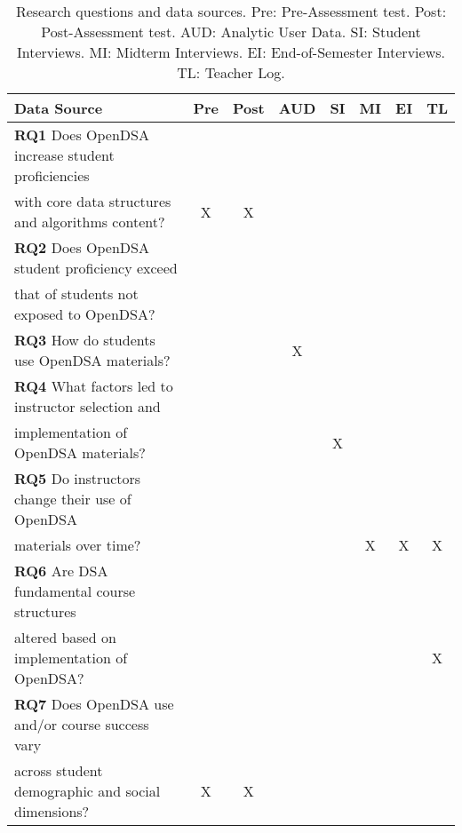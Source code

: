 \documentclass[11pt]{article}
\begin{document}
\begin{table}
\caption{Research questions and data sources.
Pre: Pre-Assessment test.
Post: Post-Assessment test.
AUD: Analytic User Data.
SI: Student Interviews.
MI: Midterm Interviews.
EI: End-of-Semester Interviews.
TL: Teacher Log.
}
\label{Exhibit}
\begin{tabular}{|l|c|c|c|c|c|c|c|}
\hline
Data Source&Pre&Post&AUD&SI&MI&EI&TL\\
\hline
\textbf{RQ1} Does OpenDSA increase student proficiencies&&&&&&&\\
with core data structures and algorithms content?&X&X&&&&&\\
\hline
\textbf{RQ2} Does OpenDSA student proficiency exceed&&&&&&&\\
that of students not exposed to OpenDSA?&&&&&&&\\
\hline
\textbf{RQ3} How do students use OpenDSA materials?&&&X&&&&\\
\hline
\textbf{RQ4} What factors led to instructor selection and&&&&&&&\\
implementation of OpenDSA materials?&&&&X&&&\\
\hline
\textbf{RQ5} Do instructors change their use of OpenDSA&&&&&&&\\
materials over time?&&&&&X&X&X\\
\hline
\textbf{RQ6} Are DSA fundamental course structures&&&&&&&\\
altered based on implementation of OpenDSA?&&&&&&&X\\
\hline
\textbf{RQ7} Does OpenDSA use and/or course success vary&&&&&&&\\
across student demographic and social dimensions?&X&X&&&&&\\
\hline
\end{tabular}
\vspace{-\bigskipamount}
\end{table}
\end{document}
